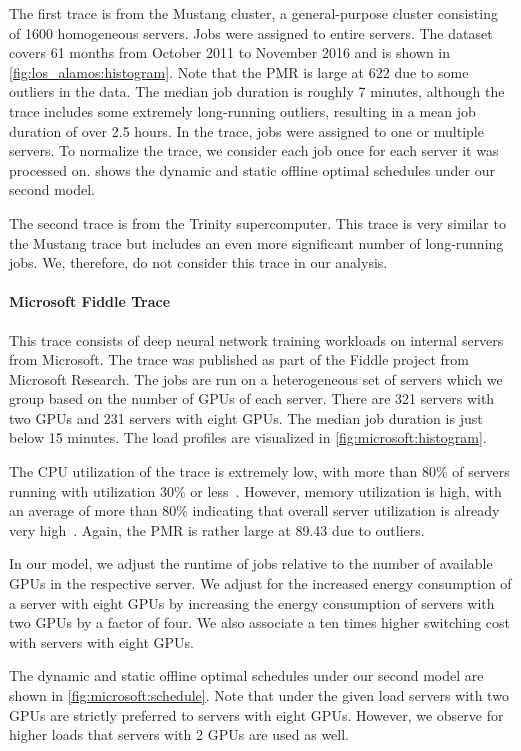 The first trace is from the Mustang cluster, a general-purpose cluster consisting of 1600 homogeneous servers. Jobs were assigned to entire servers. The dataset covers 61 months from October 2011 to November 2016 and is shown in \cref{fig:los_alamos:histogram}. Note that the PMR is large at $622$ due to some outliers in the data. The median job duration is roughly 7 minutes, although the trace includes some extremely long-running outliers, resulting in a mean job duration of over 2.5 hours. In the trace, jobs were assigned to one or multiple servers. To normalize the trace, we consider each job once for each server it was processed on.  shows the dynamic and static offline optimal schedules under our second model.

The second trace is from the Trinity supercomputer. This trace is very similar to the Mustang trace but includes an even more significant number of long-running jobs. We, therefore, do not consider this trace in our analysis.

\paragraph{Microsoft Fiddle Trace~\cite{Jeon2019}} This trace consists of deep neural network training workloads on internal servers from Microsoft. The trace was published as part of the Fiddle project from Microsoft Research. The jobs are run on a heterogeneous set of servers which we group based on the number of GPUs of each server. There are 321 servers with two GPUs and 231 servers with eight GPUs. The median job duration is just below 15 minutes. The load profiles are visualized in \cref{fig:microsoft:histogram}.

The CPU utilization of the trace is extremely low, with more than 80\% of servers running with utilization 30\% or less~\cite{Santhanam2019}. However, memory utilization is high, with an average of more than 80\% indicating that overall server utilization is already very high~\cite{Santhanam2019}. Again, the PMR is rather large at 89.43 due to outliers.

In our model, we adjust the runtime of jobs relative to the number of available GPUs in the respective server. We adjust for the increased energy consumption of a server with eight GPUs by increasing the energy consumption of servers with two GPUs by a factor of four. We also associate a ten times higher switching cost with servers with eight GPUs.

The dynamic and static offline optimal schedules under our second model are shown in \cref{fig:microsoft:schedule}. Note that under the given load servers with two GPUs are strictly preferred to servers with eight GPUs. However, we observe for higher loads that servers with 2 GPUs are used as well.

